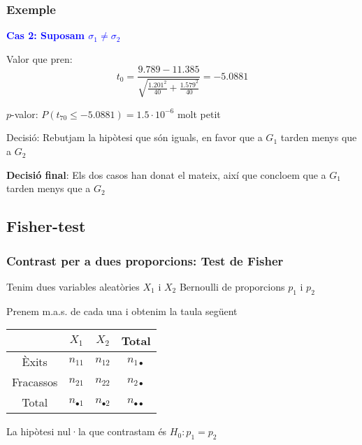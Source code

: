 \documentclass[12pt,t]{beamer}\usepackage[]{graphicx}\usepackage[]{color}
\newcommand{\blue}[1]{\textcolor{blue}{#1}}
\renewcommand{\emph}[1]{{\color{red}#1}}
\renewcommand{\leq}{\leqslant}
\theoremstyle{plain}
\theoremstyle{definition}
\begin{document}
\begin{frame}
\frametitle{Exemple}
\vspace*{-2ex}

\textbf{\blue{Cas 2: Suposam $\sigma_1\neq \sigma_2$}}
\medskip

\emph{Valor que pren}: 
$$
t_0=\frac{9.789-11.385}{\sqrt{\frac{1.201^2}{40}+\frac{1.579^2}{40}}}=-5.0881
$$
\medskip

\emph{$p$-valor}: 
$P(t_{70}\leq-5.0881)=1.5\cdot 10^{-6}$ molt petit
\medskip

\emph{Decisió}: Rebutjam la hipòtesi que són iguals, en favor que a $G_1$ tarden menys que a $G_2$
\pause\bigskip 

\emph{\bf Decisió final}: Els dos casos han donat el mateix, així que concloem que a $G_1$ tarden menys que a $G_2$


\end{frame}



\subsection{Fisher-test}

\begin{frame}
\frametitle{Contrast per a dues proporcions: Test de Fisher}

Tenim dues variables aleatòries $X_1$ i $X_2$ Bernoulli de proporcions  $p_1$ i $p_2$
\medskip

Prenem m.a.s. de cada una i obtenim la taula següent
\begin{center}
\begin{tabular}{c|cc|c|}
  & $X_1$ & $X_2$ &  Total\\\hline
Èxits & $n_{11}$ & $n_{12}$ &  $n_{1\bullet}$\\
Fracassos & $n_{21}$ & $n_{22}$ &  $n_{2\bullet}$ \\\hline 
Total & $n_{\bullet1}$ & $n_{\bullet2}$ & $n_{\bullet\bullet}$
\\\hline
\end{tabular}
\end{center}
\medskip

La hipòtesi nul·la que contrastam és $H_0: p_1=p_2$




\end{frame}
\end{document}
